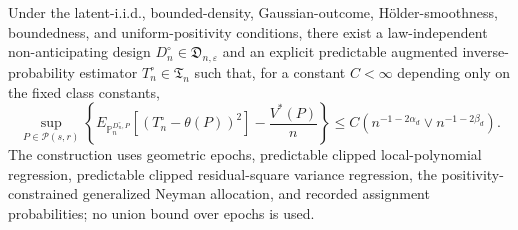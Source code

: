 Under the latent-i.i.d., bounded-density, Gaussian-outcome, Hölder-smoothness, boundedness, and uniform-positivity conditions, there exist a law-independent non-anticipating design \(D_n^{\circ}\in\mathfrak D_{n,\varepsilon}\) and an explicit predictable augmented inverse-probability estimator \(T_n^{\circ}\in\mathfrak T_n\) such that, for a constant \(C<\infty\) depending only on the fixed class constants,
\[
\sup_{P\in\mathcal P(s,r)}
\left\{
E_{\mathbb P_n^{D_n^{\circ},P}}[(T_n^{\circ}-\theta(P))^2]
-\frac{V^*(P)}{n}
\right\}
\leq C\left(n^{-1-2\alpha_d}\vee n^{-1-2\beta_d}\right).
\]
The construction uses geometric epochs, predictable clipped local-polynomial regression, predictable clipped residual-square variance regression, the positivity-constrained generalized Neyman allocation, and recorded assignment probabilities; no union bound over epochs is used.